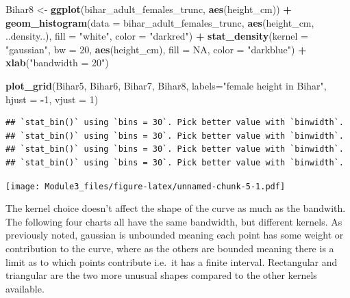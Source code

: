 \documentclass[]{book}
\newenvironment{Shaded}{\begin{snugshade}}{\end{snugshade}}
\newcommand{\KeywordTok}[1]{\textcolor[rgb]{0.13,0.29,0.53}{\textbf{#1}}}
\newcommand{\DataTypeTok}[1]{\textcolor[rgb]{0.13,0.29,0.53}{#1}}
\newcommand{\DecValTok}[1]{\textcolor[rgb]{0.00,0.00,0.81}{#1}}
\newcommand{\StringTok}[1]{\textcolor[rgb]{0.31,0.60,0.02}{#1}}
\newcommand{\OtherTok}[1]{\textcolor[rgb]{0.56,0.35,0.01}{#1}}
\newcommand{\OperatorTok}[1]{\textcolor[rgb]{0.81,0.36,0.00}{\textbf{#1}}}
\newcommand{\NormalTok}[1]{#1}
\theoremstyle{definition}
\theoremstyle{definition}
\theoremstyle{definition}
\theoremstyle{remark}
\begin{document}
\begin{Shaded}
\begin{Highlighting}[]
\NormalTok{Bihar8 <-}\StringTok{ }\KeywordTok{ggplot}\NormalTok{(bihar_adult_females_trunc, }\KeywordTok{aes}\NormalTok{(height_cm)) }\OperatorTok{+}\StringTok{ }
\StringTok{  }\KeywordTok{geom_histogram}\NormalTok{(}\DataTypeTok{data =}\NormalTok{ bihar_adult_females_trunc, }\KeywordTok{aes}\NormalTok{(height_cm, ..density..), }\DataTypeTok{fill =} \StringTok{"white"}\NormalTok{, }\DataTypeTok{color =} \StringTok{"darkred"}\NormalTok{) }\OperatorTok{+}
\StringTok{  }\KeywordTok{stat_density}\NormalTok{(}\DataTypeTok{kernel =} \StringTok{"gaussian"}\NormalTok{, }\DataTypeTok{bw =} \DecValTok{20}\NormalTok{, }\KeywordTok{aes}\NormalTok{(height_cm), }\DataTypeTok{fill =} \OtherTok{NA}\NormalTok{, }\DataTypeTok{color =} \StringTok{"darkblue"}\NormalTok{) }\OperatorTok{+}
\StringTok{  }\KeywordTok{xlab}\NormalTok{(}\StringTok{"bandwidth = 20"}\NormalTok{)}

\KeywordTok{plot_grid}\NormalTok{(Bihar5, Bihar6, Bihar7, Bihar8, }\DataTypeTok{labels=}\StringTok{"female height in Bihar"}\NormalTok{, }\DataTypeTok{hjust =} \OperatorTok{-}\DecValTok{1}\NormalTok{, }\DataTypeTok{vjust =} \DecValTok{1}\NormalTok{)}
\end{Highlighting}
\end{Shaded}

\begin{verbatim}
## `stat_bin()` using `bins = 30`. Pick better value with `binwidth`.
## `stat_bin()` using `bins = 30`. Pick better value with `binwidth`.
## `stat_bin()` using `bins = 30`. Pick better value with `binwidth`.
## `stat_bin()` using `bins = 30`. Pick better value with `binwidth`.
\end{verbatim}

\texttt{[image: Module3\_files/figure-latex/unnamed-chunk-5-1.pdf]}

The kernel choice doesn't affect the shape of the curve as much as the
bandwith. The following four charts all have the same bandwidth, but
different kernels. As previously noted, gaussian is unbounded meaning
each point has some weight or contribution to the curve, where as the
others are bounded meaning there is a limit as to which points
contribute i.e.~it has a finite interval. Rectangular and triangular are
the two more unusual shapes compared to the other kernels available.
\end{document}
